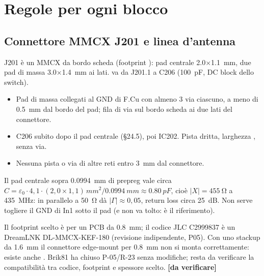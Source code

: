 \documentclass[a4paper,10pt]{article}
\newcommand{\net}[1]{\texttt{\detokenize{#1}}}
\newcommand{\dv}{\textcolor{verfr}{\textbf{[da verificare]}}}
\newcounter{regola}
\begin{document}
\section{Regole per ogni blocco}
\label{sec:blocchi}

\subsection{Connettore MMCX J201 e linea d'antenna}
\label{sec:j201}
J201 è un MMCX da bordo scheda (footprint ):
pad centrale \SI{2.0}{}$\times$\SI{1.1}{mm}, due pad di massa \SI{3.0}{}$\times$\SI{1.4}{mm} ai lati.
\net{RF_ANT} va da J201.1 a C206 (\SI{100}{pF}, DC block dello switch).

\begin{regola}[J201]
\begin{itemize}
\item Pad di massa collegati al GND di F.Cu con almeno 3 via ciascuno, a meno di \SI{0.5}{mm} dal bordo
      del pad; fila di via sul bordo scheda ai due lati del connettore.
\item C206 subito dopo il pad centrale (\S24.5), poi IC202. Pista \net{RF_ANT} dritta, larghezza
      \net{RF_50R}, senza via.
\item Nessuna pista o via di altre reti entro \SI{3}{mm} dal connettore.
\end{itemize}
\end{regola}

\begin{perche}
Il pad centrale sopra \SI{0.0994}{mm} di prepreg vale circa
$C=\varepsilon_0\cdot4{,}1\cdot(2{,}0\times1{,}1)\,\si{mm^2}/\SI{0.0994}{mm}\approx\SI{0.80}{pF}$, cioè
$|X|=\SI{455}{\ohm}$ a \SI{435}{MHz}: in parallelo a \SI{50}{\ohm} dà $|\Gamma|\approx0{,}05$, return loss
circa \SI{25}{dB}. Non serve togliere il GND di In1 sotto il pad (e non va tolto: è il riferimento).
\end{perche}

\begin{attenzione}
Il footprint scelto è per un PCB da \SI{0.8}{mm}; il codice JLC C2999837 è un DreamLNK DL-MMCX-KEF-180
(revisione indipendente, P05). Con uno stackup da \SI{1.6}{mm} il connettore edge-mount per \SI{0.8}{mm}
non si monta correttamente: esiste anche . Brik81
ha chiuso P-05/R-23 senza modifiche; resta da verificare la compatibilità tra codice, footprint e spessore
scelto. \dv
\end{attenzione}
\end{document}
